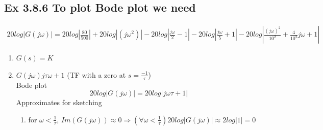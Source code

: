 \documentclass[letterpaper]{article}
\begin{document}
\subsection*{Ex 3.8.6 To plot Bode plot we need}
\begin{align*}
20log|G(j\omega)|=20log|\frac{80}{500}|+20log|(j\omega^2)|-20log|\frac{j\omega}{2}-1|-20log|\frac{j\omega}{5}+1|-20log|\frac{(j\omega)^2}{10^2}+\frac{4}{10^2}j\omega + 1|
\end{align*}
\begin{enumerate}
	\item $G(s)=K$
	\item $G(j\omega)j\tau\omega+1$ (TF with a zero at $s=\frac{-1}{\tau}$)\\
	Bode plot $$20log|G(j\omega)|=20log|j\omega \tau +1|$$
	Approximates for sketching
	\begin{enumerate}
		\item for $\omega < \frac{1}{\tau}$, $Im(G(j\omega)) \approx 0\Rightarrow (\forall \omega < \frac{1}{\tau})20log|G(j\omega)|\approx 2 log|1|=0$
	\end{enumerate}
	\end{enumerate}
\end{document}
